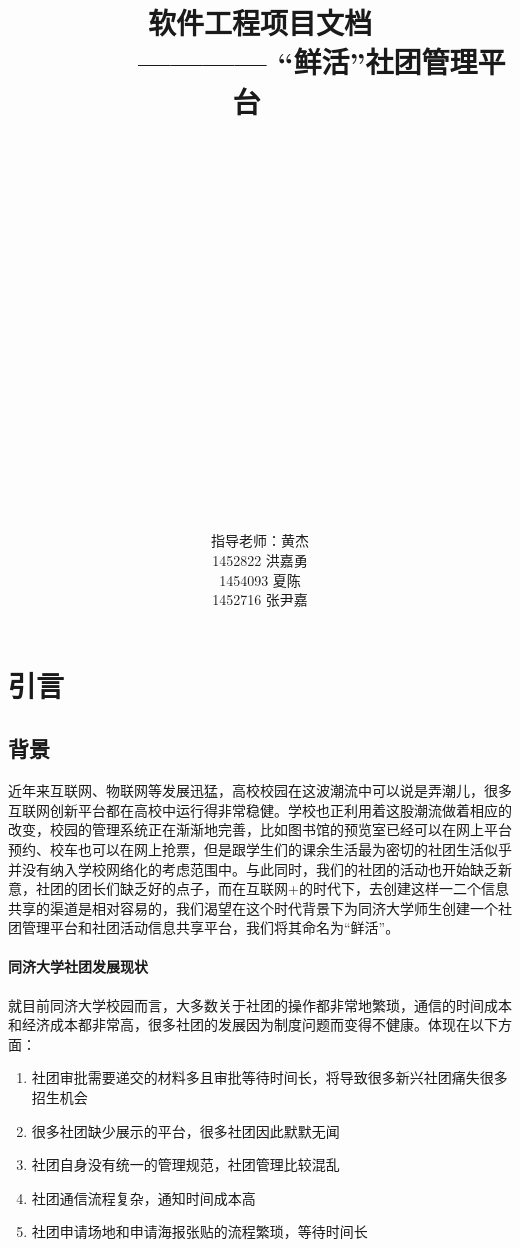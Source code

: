 \documentclass[UTF8]{ctexart}
\title{\Huge \textbf{软件工程项目文档}  \\
\large ~~~~~~~ ———— “鲜活”社团管理平台
 ~\\ ~\\ ~\\ ~\\ ~\\ ~\\ ~\\ ~\\ ~\\ ~\\ ~\\}
\author{
\large 指导老师：黄杰 \\
\large 1452822 洪嘉勇 \\
\large 1454093 夏陈   \\
\large 1452716 张尹嘉 \\
}
\begin{document}
\maketitle




\newpage
\tableofcontents
\newpage

\section{引言}
\subsection{背景}
近年来互联网、物联网等发展迅猛，高校校园在这波潮流中可以说是弄潮儿，很多互联网创新平台都在高校中运行得非常稳健。学校也正利用着这股潮流做着相应的改变，校园的管理系统正在渐渐地完善，比如图书馆的预览室已经可以在网上平台预约、校车也可以在网上抢票，但是跟学生们的课余生活最为密切的社团生活似乎并没有纳入学校网络化的考虑范围中。与此同时，我们的社团的活动也开始缺乏新意，社团的团长们缺乏好的点子，而在互联网+的时代下，去创建这样一二个信息共享的渠道是相对容易的，我们渴望在这个时代背景下为同济大学师生创建一个社团管理平台和社团活动信息共享平台，我们将其命名为“鲜活”。
\paragraph{同济大学社团发展现状} 
就目前同济大学校园而言，大多数关于社团的操作都非常地繁琐，通信的时间成本和经济成本都非常高，很多社团的发展因为制度问题而变得不健康。体现在以下方面：

\begin{enumerate}[1)]
\item 社团审批需要递交的材料多且审批等待时间长，将导致很多新兴社团痛失很多招生机会
\item 很多社团缺少展示的平台，很多社团因此默默无闻
\item 社团自身没有统一的管理规范，社团管理比较混乱
\item 社团通信流程复杂，通知时间成本高
\item 社团申请场地和申请海报张贴的流程繁琐，等待时间长
\end{enumerate}
\end{document}
